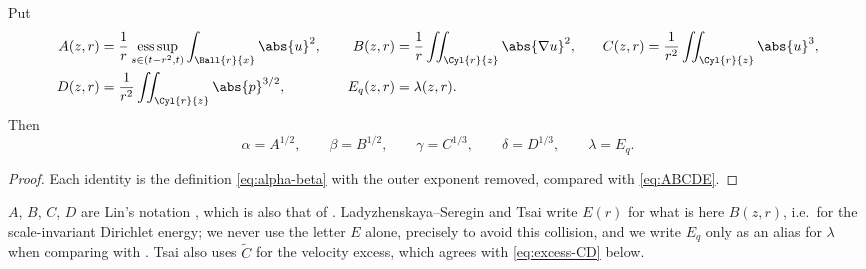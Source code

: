 \documentclass[11pt,reqno]{amsart}
\begin{document}
\begin{lemma}
\label{lem:dictionary}
Put
\begin{equation}\label{eq:ABCDE}
\begin{aligned}
  A(z,r)&=\frac1r\operatorname*{ess\,sup}_{s\in(t-r^{2},t)}\int_{\Ball{r}{x}}\abs{u}^{2},
  &\quad
  B(z,r)&=\frac1r\iint_{\Cyl{r}{z}}\abs{\nabla u}^{2},
  &\quad
  C(z,r)&=\frac1{r^{2}}\iint_{\Cyl{r}{z}}\abs{u}^{3},\\
  D(z,r)&=\frac1{r^{2}}\iint_{\Cyl{r}{z}}\abs{p}^{3/2},
  &\quad
  E_{q}(z,r)&=\lambda(z,r).
\end{aligned}
\end{equation}
Then
\begin{equation}\label{eq:dictionary}
  \alpha=A^{1/2},\qquad\beta=B^{1/2},\qquad\gamma=C^{1/3},
  \qquad\delta=D^{1/3},\qquad\lambda=E_{q} .
\end{equation}
\end{lemma}

\begin{proof}
Each identity is the definition \eqref{eq:alpha-beta} with the outer exponent
removed, compared with \eqref{eq:ABCDE}.
\end{proof}

\begin{remark}\label{rem:letters}
$A$, $B$, $C$, $D$ are Lin's notation \cite[\S3]{Lin1998}, which is also that of
\cite{CKN1982}. Ladyzhenskaya--Seregin \cite[\S5]{LadyzhenskayaSeregin1999} and
Tsai \cite[\S6.3]{Tsai2018} write $E(r)$ for what is here $B(z,r)$, i.e.\ for the
scale-invariant Dirichlet energy; we never use the letter $E$ alone, precisely
to avoid this collision, and we write $E_{q}$ only as an alias for $\lambda$ when
comparing with \cite{Tsai2018}. Tsai \cite[\S6.3]{Tsai2018} also uses
$\widetilde C$ for the velocity excess, which agrees with \eqref{eq:excess-CD}
below.
\end{remark}
\end{document}
